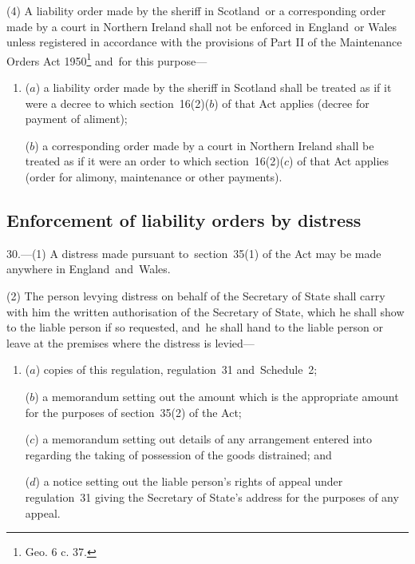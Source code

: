 \documentclass[12pt,a4paper]{article}
\begin{document}
(4) A liability order made by the sheriff in Scotland~or a corresponding order made by a court in Northern Ireland shall not be enforced in England~or Wales unless registered in accordance with the provisions of 
Part II %
of the Maintenance Orders Act 1950\footnote{ Geo. 6 c. 37.} and~for this purpose—
\begin{enumerate}\item[]
($a$) a liability order made by the sheriff in Scotland shall be treated as if it were a decree to which section~16(2)($b$) of that Act applies (decree for payment of aliment);

($b$) a corresponding order made by a court in Northern Ireland shall be treated as if it were an order to which section~16(2)($c$) of that Act applies (order for alimony, maintenance or other payments).
\end{enumerate}


\subsection[30. Enforcement of liability orders by distress]{Enforcement of liability orders by distress}

30.—(1) A distress made pursuant to~section~35(1) of the Act may be made anywhere in England~and~Wales.

(2) The person levying distress on behalf of the Secretary of State shall carry with him the written authorisation of the Secretary of State, which he shall show to the liable person if so requested, and~he shall hand to the liable person or leave at the premises where the distress is levied—
\begin{enumerate}\item[]
($a$) copies of this regulation, regulation~31 and~Schedule~2;

($b$) a memorandum setting out the amount which is the appropriate amount for the purposes of section~35(2) of the Act;

($c$) a memorandum setting out details of any arrangement entered into regarding the taking of possession of the goods distrained; and

($d$) a notice setting out the liable person’s rights of appeal under regulation~31 giving the Secretary of State’s address for the purposes of any appeal.
\end{enumerate}
\end{document}
